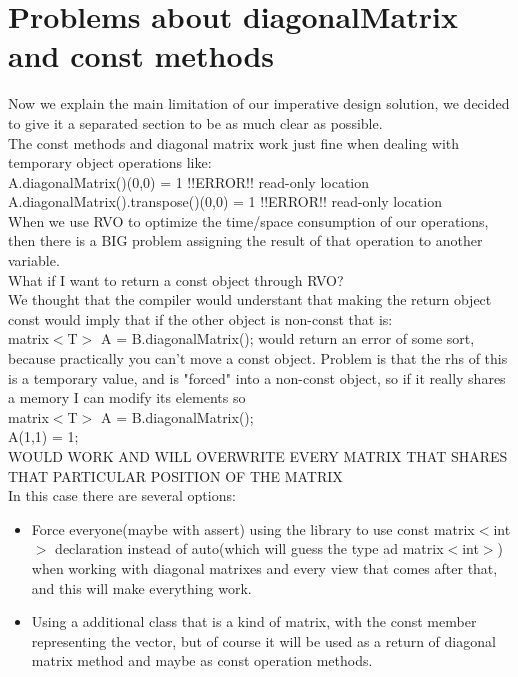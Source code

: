 \documentclass[12pt]{article}%
\begin{document}
\section{Problems about diagonalMatrix and const methods}
Now we explain the main limitation of our imperative design solution, we decided to give it a separated section to be as much clear as possible.\\
The const methods and diagonal matrix work just fine when dealing with temporary object operations like:\\
A.diagonalMatrix()(0,0) = 1 !!ERROR!! read-only location\\
A.diagonalMatrix().transpose()(0,0) = 1 !!ERROR!! read-only location\\

When we use RVO to optimize the time/space consumption of our operations, then there is a BIG problem assigning the result of that operation to another variable.\\
What if I want to return a const object through RVO?\\
We thought that the compiler would understant that making the return object const would imply that if the other object is non-const that is:\\
matrix$<$T$>$ A = B.diagonalMatrix(); would return an error of some sort, because practically you can't move a const object.
Problem is that the rhs of this is a temporary value, and is "forced" into a non-const object,
so if it really shares a memory I can modify its elements so\\
matrix$<$T$>$ A = B.diagonalMatrix();\\
A(1,1) = 1;\\
WOULD WORK AND WILL OVERWRITE EVERY MATRIX THAT SHARES THAT PARTICULAR POSITION OF THE MATRIX\\
In this case there are several options:
\begin{itemize}
    \item Force everyone(maybe with assert) using the library to use const matrix$<$int$>$ declaration instead of  auto(which will guess the type ad matrix$<$int$>$) when working with diagonal matrixes and every view that comes after that, and this will make everything work.
    \item Using a additional class that is a kind of matrix, with the const member representing the vector, but of course it will be used as a return of diagonal matrix method and maybe as const operation methods.
\end{itemize}
 
\end{document}
